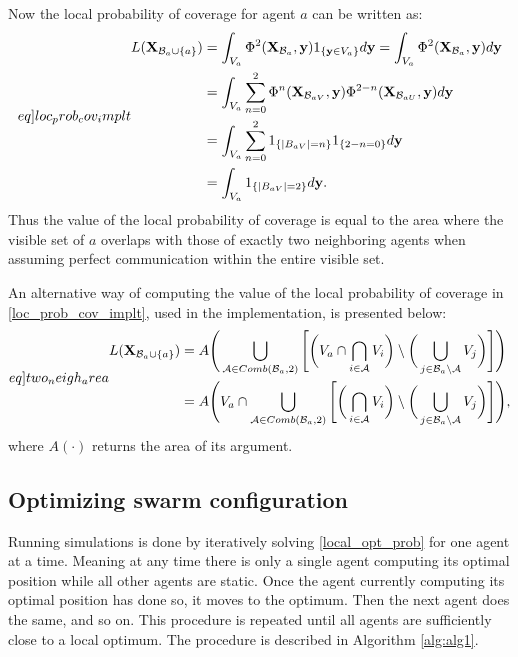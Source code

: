Now the local probability of coverage for agent $a$ can be written as:
\begin{equation}\label[eq]{loc_prob_cov_implt}
  \begin{split}
    L(\mathbf{X}_{\mathcal{B}_{a}\cup\{a\}}) &= \int_{V_{a}}\Phi^{2}(\mathbf{X}_{\mathcal{B}_{a}}, \mathbf{y})1_{\{\mathbf{y}\in V_{a}\}}d\mathbf{y} = \int_{V_{a}}\Phi^{2}(\mathbf{X}_{\mathcal{B}_{a}}, \mathbf{y})d\mathbf{y}\\
    &= \int_{V_{a}}\sum_{n = 0}^{2} \Phi^{n}(\mathbf{X}_{\mathcal{B}_{a V}}, \mathbf{y})\Phi^{2-n}(\mathbf{X}_{\mathcal{B}_{a U}},\mathbf{y})d\mathbf{y}\\
    &= \int_{V_{a}}\sum_{n = 0}^{2}1_{\{|B_{a V}| = n\}}1_{\{2-n = 0\}}d\mathbf{y}\\
    &= \int_{V_{a}}1_{\{|B_{a V}| = 2\}}d\mathbf{y}.
  \end{split}
\end{equation}
Thus the value of the local probability of coverage is equal to the area where the visible set of $a$ overlaps with those of exactly two neighboring agents when assuming perfect communication within the entire visible set.

An alternative way of computing the value of the local probability of coverage in \eqref{loc_prob_cov_implt}, used in the implementation,
is presented below:
\begin{equation}\label[eq]{two_neigh_area}
  \begin{split}
    L(\mathbf{X}_{\mathcal{B}_{a}\cup\{a\}}) &= A\Biggr(\bigcup_{\mathcal{A}\in Comb(\mathcal{B}_{a}, 2)}\Bigg[\bigg(V_{a}\cap \bigcap_{i\in\mathcal{A}}V_{i}\bigg)\setminus\bigg(\bigcup_{j\in\mathcal{B}_{a}\setminus\mathcal{A}}V_{j}\bigg)\Bigg]\Biggr)\\
    &= A\Biggr(V_{a}\cap\bigcup_{\mathcal{A}\in Comb(\mathcal{B}_{a}, 2)}\Bigg[\bigg(\bigcap_{i\in\mathcal{A}}V_{i}\bigg)\setminus\bigg(\bigcup_{j\in\mathcal{B}_{a}\setminus\mathcal{A}}V_{j}\bigg)\Bigg]\Biggr),
  \end{split}
\end{equation}
where $A(\cdot)$ returns the area of its argument.
\subsection{Optimizing swarm configuration}
Running simulations is done by iteratively solving \eqref{local_opt_prob} for one agent at a time. Meaning at any time there is only
a single agent computing its optimal position while all other agents are static. Once the agent currently computing its optimal position
has done so, it moves to the optimum. Then the next agent does the same, and so on. This procedure is repeated
until all agents are sufficiently close to a local optimum. The procedure is described in Algorithm \ref{alg:alg1}.

